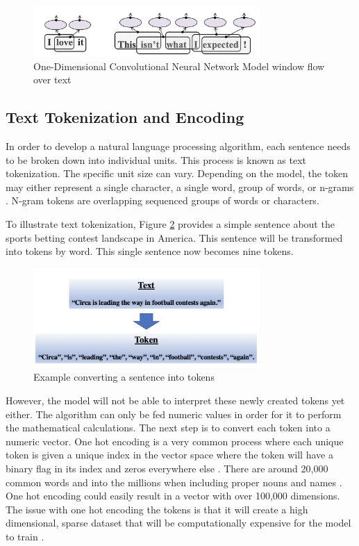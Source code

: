 \documentclass[5p,authoryear]{elsarticle}
\begin{document}
\begin{figure}[!h] 
    \centering
	\includegraphics[width=3.4in]{figures/1D_CNN.png}
	\caption[]{One-Dimensional Convolutional Neural Network Model window flow over text} 
	\label{CNN_flow} 
\end{figure}



\subsection{Text Tokenization and Encoding}\label{token}

In order to develop a natural language processing algorithm, each sentence needs to be broken down into individual units. This process is known as text tokenization. The specific unit size can vary. Depending on the model, the token may either represent a single character, a single word, group of words, or n-grams \citep{chollet}. N-gram tokens are overlapping sequenced groups of words or characters.

To illustrate text tokenization, Figure \ref{tokenpic} provides a simple sentence about the sports betting contest landscape in America. This sentence will be transformed into tokens by word. This single sentence now becomes nine tokens.


\begin{figure}[!h] 
    \centering
	\includegraphics[width=3.4in]{figures/Text_Tokenization.png}
	\caption[]{Example converting a sentence into tokens} 
	\label{tokenpic} 
\end{figure}

However, the model will not be able to interpret these newly created tokens yet either. The algorithm can only be fed numeric values in order for it to perform the mathematical calculations. The next step is to convert each token into a numeric vector. One hot encoding is a very common process where each unique token is given a unique index in the vector space where the token will have a binary flag in its index and zeros everywhere else \citep{mool}. There are around 20,000 common words and into the millions when including proper nouns and names \citep{lane}. One hot encoding could easily result in a vector with over 100,000 dimensions. The issue with one hot encoding the tokens is that it will create a high dimensional, sparse dataset that will be computationally expensive for the model to train \citep{chollet}. 
\end{document}
